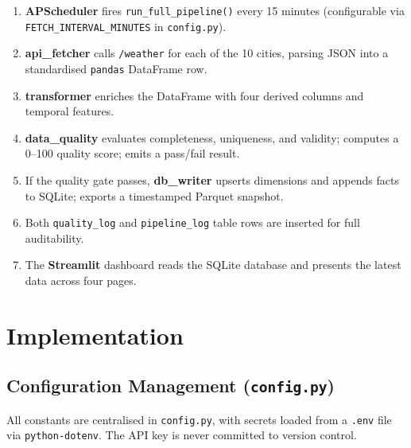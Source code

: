 \documentclass[12pt,a4paper]{report}
\begin{document}
\begin{enumerate}[leftmargin=*, label=\textbf{Step \arabic*.}]
  \item \textbf{APScheduler} fires \texttt{run\_full\_pipeline()} every 15 minutes (configurable via \texttt{FETCH\_INTERVAL\_MINUTES} in \texttt{config.py}).
  \item \textbf{api\_fetcher} calls \texttt{/weather} for each of the 10 cities, parsing JSON into a standardised \texttt{pandas} DataFrame row.
  \item \textbf{transformer} enriches the DataFrame with four derived columns and temporal features.
  \item \textbf{data\_quality} evaluates completeness, uniqueness, and validity; computes a 0--100 quality score; emits a pass/fail result.
  \item If the quality gate passes, \textbf{db\_writer} upserts dimensions and appends facts to SQLite; exports a timestamped Parquet snapshot.
  \item Both \texttt{quality\_log} and \texttt{pipeline\_log} table rows are inserted for full auditability.
  \item The \textbf{Streamlit} dashboard reads the SQLite database and presents the latest data across four pages.
\end{enumerate}

\chapter{Implementation}

\section{Configuration Management (\texttt{config.py})}

All constants are centralised in \texttt{config.py}, with secrets loaded from a \texttt{.env} file via \texttt{python-dotenv}. The API key is never committed to version control.
\end{document}
